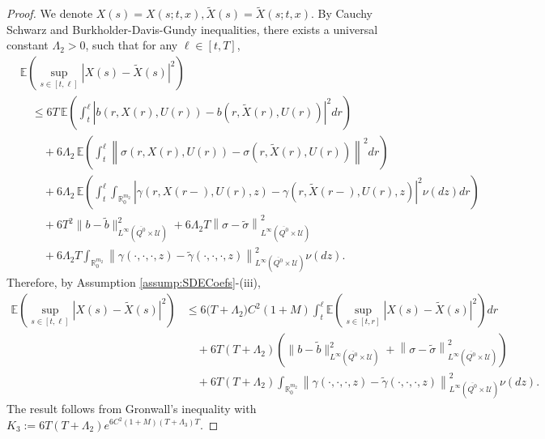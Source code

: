 \documentclass[amscd,amssymb,11pt]{article}
\numberwithin{theorem}{section}
\numberwithin{equation}{section}
\begin{document}
\begin{proof}
We denote $X(s)=X(s;t,x),\widetilde{X}(s)=\widetilde{X}(s;t,x)$.
By Cauchy Schwarz and Burkholder-Davis-Gundy inequalities, there exists a universal constant $\Lambda_{2}>0$, such that for any $\ell\in[t,T]$,
\begin{align*}
&\mathbb{E}\left(\sup_{s\in[t,\ell]}\left|X(s)-\widetilde{X}(s)\right|^{2}\right)\\
&\quad\leq 6T\,\mathbb{E}\left(\int_{t}^{\ell}\left|b\left(r,X(r),U(r)\right)-b\left(r,\widetilde{X}(r),U(r)\right)\right|^{2}dr\right)\\
&\qquad +6\Lambda_{2}\,\mathbb{E}\left(\int_{t}^{\ell}\left\|\sigma\left(r,X(r),U(r)\right)-\sigma\left(r,\widetilde{X}(r),U(r)\right)\right\|^{2}dr\right)\\
&\qquad +6\Lambda_{2}\,\mathbb{E}\left(\int_{t}^{\ell}\int_{\mathbb{R}^{m_{2}}_{0}}\left|\gamma\left(r,X(r-),U(r),z\right)-\gamma\left(r,\widetilde{X}(r-),U(r),z\right)\right|^{2}\nu(dz)dr\right)\\
&\qquad +6T^{2}\big\|b-\tilde{b}\big\|_{L^{\infty}(\overline{Q^{0}}\times\mathcal{U})}^{2}+6\Lambda_{2}T\left\|\sigma-\tilde{\sigma}\right\|_{L^{\infty}(\overline{Q^{0}}\times\mathcal{U})}^{2}\\
&\qquad +6\Lambda_{2}T\int_{\mathbb{R}^{m_{2}}_{0}}\left\|\gamma(\cdot,\cdot,\cdot,z)-\widetilde{\gamma}(\cdot,\cdot,\cdot,z)\right\|_{L^{\infty}(\overline{Q^{0}}\times\mathcal{U})}^{2}\nu(dz).
\end{align*}
Therefore, by Assumption \ref{assump:SDECoefs}-(iii),
\begin{align*}
\mathbb{E}\left(\sup_{s\in[t,\ell]}\left|X(s)-\widetilde{X}(s)\right|^{2}\right)&\leq 6\big(T+\Lambda_{2}\big)C^{2}(1+M)\int_{t}^{\ell}\mathbb{E}\left(\sup_{s\in[t,r]}\left|X(s)-\widetilde{X}(s)\right|^{2}\right)dr\\
&\quad +6T(T+\Lambda_{2})\left(\big\|b-\tilde{b}\big\|_{L^{\infty}(\overline{Q^{0}}\times\mathcal{U})}^{2}+\left\|\sigma-\tilde{\sigma}\right\|_{L^{\infty}(\overline{Q^{0}}\times\mathcal{U})}^{2}\right)\\
&\quad +6T(T+\Lambda_{2})\int_{\mathbb{R}^{m_{2}}_{0}}\left\|\gamma(\cdot,\cdot,\cdot,z)-\widetilde{\gamma}(\cdot,\cdot,\cdot,z)\right\|_{L^{\infty}(\overline{Q^{0}}\times\mathcal{U})}^{2}\nu(dz).
\end{align*}
The result follows from Gronwall's inequality with $K_{3}:=6T(T+\Lambda_{2})e^{6C^{2}(1+M)(T+\Lambda_{3})T}$.
\end{proof}
\end{document}

